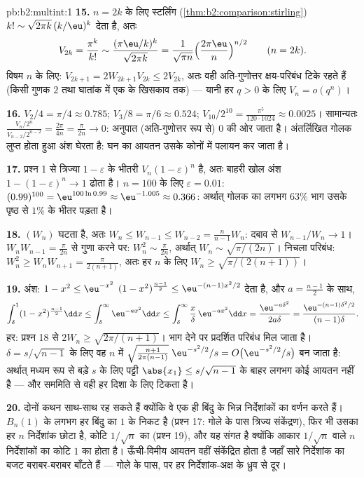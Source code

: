 \begin{solution}{pb:b2:multint:1}
\textbf{15.} $n = 2k$ के लिए स्टर्लिंग (\cref{thm:b2:comparison:stirling}) $k! \sim
\sqrt{2\pi k}\,(k/\eu)^k$ देता है, अतः
\[
V_{2k} = \frac{\pi^k}{k!}
\sim \frac{(\pi\eu/k)^k}{\sqrt{2\pi k}}
= \frac1{\sqrt{\pi n}}\Bigl(\frac{2\pi\eu}n\Bigr)^{n/2}
\qquad (n = 2k).
\]
विषम $n$ के लिए: $V_{2k+1} = 2W_{2k+1}V_{2k} \leq 2V_{2k}$, अतः वही अति-गुणोत्तर क्षय-परिबंध टिके रहते
हैं (किसी गुणक $2$ तथा घातांक में एक के खिसकाव तक) --- यानी हर
$q >
0$ के लिए $V_n = o(q^n)$।

\textbf{16.} $V_2/4 = \pi/4 \approx 0.785$; $V_3/8 = \pi/6
\approx 0.524$; $V_{10}/2^{10} = \frac{\pi^5}{120\cdot1024}
\approx 0.0025$। सामान्यतः $\frac{V_n/2^n}{V_{n-2}/2^{n-2}}
= \frac{2\pi}{4n} = \frac{\pi}{2n} \to 0$: अनुपात
(अति-गुणोत्तर रूप से) $0$ की ओर जाता है। अंतर्लिखित गोलक लुप्त
होता हुआ अंश घेरता है: घन का आयतन उसके कोनों में पलायन कर जाता है।

\textbf{17.} प्रश्न 1 से त्रिज्या $1 -
\varepsilon$ के भीतरी  $V_n(1-\varepsilon)^n$
है, अतः बाहरी खोल अंश $1 - (1 - \varepsilon)^n \to 1$ ढोता है। $n = 100$ के लिए $\varepsilon = 0.01$: $(0.99)^{100} =
\eu^{100\ln0.99} \approx \eu^{-1.005} \approx 0.366$: अर्थात्
गोलक का लगभग $63\%$ भाग उसके पृष्ठ से $1\%$ के भीतर पड़ता है।

\textbf{18.} $(W_n)$ घटता है, अतः $W_n \leq W_{n-1} \leq
W_{n-2} = \frac{n}{n-1}W_n$: दबाव से $W_{n-1}/W_n \to 1$। $W_nW_{n-1} = \frac\pi{2n}$ से गुणा करने
पर: $W_n^2 \sim
\frac\pi{2n}$, अर्थात् $W_n \sim \sqrt{\pi/(2n)}$। निचला परिबंध: $W_n^2 \geq W_nW_{n+1} = \frac{\pi}{2(n+1)}$, अतः हर $n$ के लिए $W_n \geq
\sqrt{\pi/(2(n+1))}$।

\textbf{19.} अंश: $1 - x^2 \leq \eu^{-x^2}$ $(1 -
x^2)^{\frac{n-1}2} \leq \eu^{-(n-1)x^2/2}$ देता है, और $a =
\frac{n-1}2$ के साथ,
\[
\int_\delta^1(1 - x^2)^{\frac{n-1}2}\dd x
\leq \int_\delta^\infty\eu^{-ax^2}\dd x
\leq \int_\delta^\infty\frac x\delta\,\eu^{-ax^2}\dd x
= \frac{\eu^{-a\delta^2}}{2a\delta}
= \frac{\eu^{-(n-1)\delta^2/2}}{(n-1)\delta}.
\]
हर: प्रश्न 18 से $2W_n \geq \sqrt{2\pi/(n+1)}$। भाग देने पर प्रदर्शित परिबंध मिल जाता है।
$\delta =
s/\sqrt{n-1}$ के लिए वह $n$ में  $\sqrt{\tfrac{n+1}{2\pi(n-1)}}\;\eu^{-s^2/2}/s = O\bigl(
\eu^{-s^2/2}/s\bigr)$ बन जाता है: अर्थात्
मध्यम रूप से बड़े $s$ के लिए पट्टी $\abs{x_1} \leq s/\sqrt{n-1}$ के बाहर लगभग कोई आयतन नहीं
है --- और सममिति से वही हर दिशा के लिए टिकता है।

\textbf{20.} दोनों कथन साथ-साथ रह सकते हैं क्योंकि वे एक ही बिंदु
के भिन्न निर्देशांकों का वर्णन करते हैं। $B_n(1)$ के लगभग हर बिंदु का
 $1$ के निकट है (प्रश्न 17: गोले के पास त्रिज्य संकेंद्रण),
फिर भी उसका हर $n$ निर्देशांक छोटा है, कोटि $1/\sqrt n$ का (प्रश्न 19),
और यह संगत है क्योंकि आकार $1/\sqrt n$ वाले $n$ निर्देशांकों का 
कोटि $1$ का होता है। ऊँची-विमीय आयतन वहीं संकेंद्रित होता है जहाँ
सारे निर्देशांक  का बजट बराबर-बराबर बाँटते हैं --- गोले के
पास, पर हर निर्देशांक-अक्ष के ध्रुव से दूर।


\end{solution}
